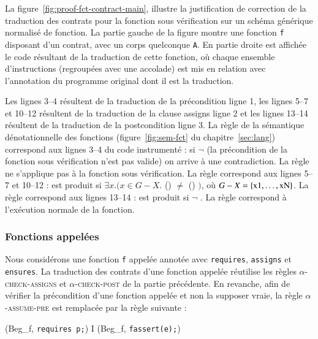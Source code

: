 

La figure~\ref{fig:proof-fct-contract-main}, illustre la justification de
correction
de la traduction des contrats pour la fonction sous vérification sur un schéma
générique normalisé de fonction.
La partie gauche de la figure montre une fonction \lstinline'f' disposant d'un
contrat, avec un corps quelconque \lstinline'A'.
En partie droite est affichée le code résultant de la traduction de cette
fonction, où chaque ensemble d'instructions (regroupées avec une accolade) est
mis en relation avec l'annotation du programme original dont il est la
traduction.

Les lignes 3--4 résultent de la traduction de la précondition ligne 1,
les lignes 5--7 et 10--12 résultent de la traduction de la clause assigns ligne
2 et les lignes 13--14 résultent de la traduction de la postcondition ligne 3.
La règle  de la sémantique dénotationnelle des fonctions
(figure~\ref{fig:sem-fct} du chapitre~\ref{sec:lang}) correspond aux lignes
3--4 du code instrumenté :
si $\lnot$  (la précondition de la fonction sous
vérification n'est pas valide) on arrive à une contradiction.
La règle  ne s'applique pas à la fonction sous vérification.
La règle  correspond aux lignes 5--7 et 10--12 : \errorenv est
produit si $\exists x. (x \in G-X.$
() $\ne$ ()
$)$,
où $G-X = \{\mbox{\lstinline'x1'},\ldots,\mbox{\lstinline'xN'}\}$.
La règle  correspond aux lignes 13--14 : \errorenv est produit
si $\lnot$ .
La règle  correspond à l'exécution normale de la fonction.


\subsubsection{Fonctions appelées}

Nous considérons une fonction \lstinline'f' appelée annotée avec
\lstinline'requires', \lstinline'assigns' et \lstinline'ensures'.
La traduction des contrats d'une fonction appelée réutilise les règles
\textsc{$\alpha$-check-assigns} et \textsc{$\alpha$-check-post} de la partie
précédente.
En revanche, afin de vérifier la précondition d'une fonction appelée et non la
supposer vraie, la règle \textsc{$\alpha$-assume-pre} est remplacée par la règle
suivante :

{\scriptsize
  {
    {(Beg_f, \mbox{\lstinline'requires p;'})
      I \concat (Beg_f, \mbox{\lstinline'fassert(e);'})}
  }
}


